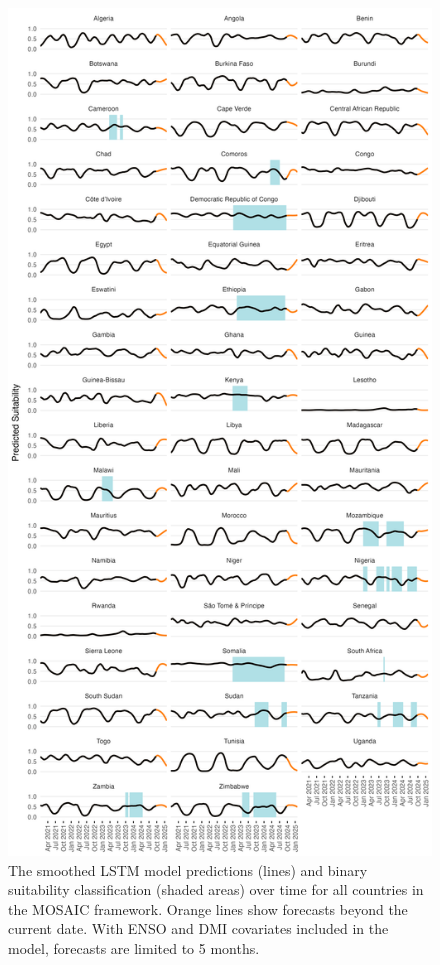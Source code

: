 \documentclass[
]{book}
\begin{document}
\begin{figure}

{\centering \includegraphics[width=1\linewidth]{figures/suitability_by_country} 

}

\caption{The smoothed LSTM model predictions (lines) and binary suitability classification (shaded areas) over time for all countries in the MOSAIC framework. Orange lines show forecasts beyond the current date. With ENSO and DMI covariates included in the model, forecasts are limited to 5 months.}\label{fig:psi-prediction-countries}
\end{figure}
\end{document}
